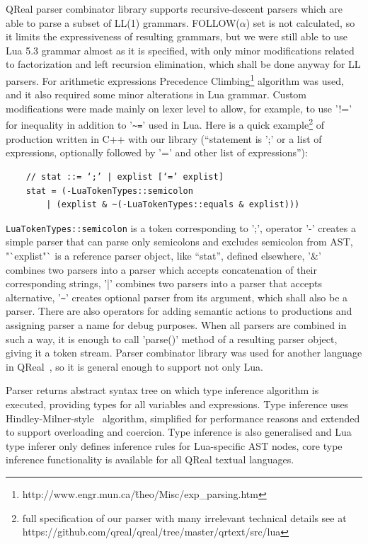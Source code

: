 \documentclass[conference]{IEEEtran}
\begin{document}
QReal parser combinator library supports recursive-descent parsers which are able to parse a subset of LL(1) grammars. FOLLOW($\alpha$) set is not calculated, so it limits the expressiveness of resulting grammars, but we were still able to use Lua 5.3 grammar almost as it is specified, with only minor modifications related to factorization and left recursion elimination, which shall be done anyway for LL parsers. For arithmetic expressions Precedence Climbing\footnote{http://www.engr.mun.ca/\~theo/Misc/exp\_parsing.htm} algorithm was used, and it also required some minor alterations in Lua grammar. Custom modifications were made mainly on lexer level to allow, for example, to use '!=' for inequality in addition to '\verb|~=|' used in Lua. Here is a quick example\footnote{full specification of our parser with many irrelevant technical details see at https://github.com/qreal/qreal/tree/master/qrtext/src/lua} of production written in C++ with our library ("`statement is ';' or a list of expressions, optionally followed by '=' and other list of expressions"'):
\begin{verbatim}
	// stat ::= ‘;’ | explist [‘=’ explist]
	stat = (-LuaTokenTypes::semicolon 
	    | (explist & ~(-LuaTokenTypes::equals & explist)))
\end{verbatim}

\verb|LuaTokenTypes::semicolon| is a token corresponding to ';', operator '-' creates a simple parser that can parse only semicolons and excludes semicolon from AST, "`explist"` is a reference parser object, like "`stat"', defined elsewhere, '\&' combines two parsers into a parser which accepts concatenation of their corresponding strings, '|' combines two parsers into a parser that accepts alternative, '\verb|~|' creates optional parser from its argument, which shall also be a parser. There are also operators for adding semantic actions to productions and assigning parser a name for debug purposes. When all parsers are combined in such a way, it is enough to call 'parse()' method of a resulting parser object, giving it a token stream. Parser combinator library was used for another language in QReal~\cite{tikhonova2015generation}, so it is general enough to support not only Lua.

Parser returns abstract syntax tree on which type inference algorithm is executed, providing types for all variables and expressions. Type inference uses Hindley-Milner-style~\cite{damas1982principal} algorithm, simplified for performance reasons and extended to support overloading and coercion. Type inference is also generalised and Lua type inferer only defines inference rules for Lua-specific AST nodes, core type inference functionality is available for all QReal textual languages.
\end{document}
